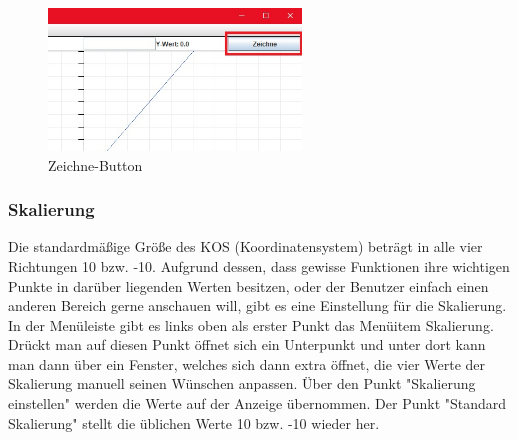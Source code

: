 \begin{figure}[ht]
	\centering
	\includegraphics[width=0.6\textwidth]{Bilder/GR_3.jpg}
	\caption{Zeichne-Button}
\end{figure}


\subsubsection{Skalierung}
Die standardmäßige Größe des KOS (Koordinatensystem) beträgt in alle vier Richtungen 10 bzw. -10.
Aufgrund dessen, dass gewisse Funktionen ihre wichtigen Punkte in darüber liegenden Werten besitzen, oder der Benutzer einfach einen anderen Bereich gerne anschauen will, gibt es eine Einstellung für die Skalierung. 
\newline
In der Menüleiste gibt es links oben als erster Punkt das Menüitem Skalierung. Drückt man auf diesen Punkt öffnet sich ein Unterpunkt und unter dort kann man dann über ein Fenster, welches sich dann extra öffnet, die vier Werte der Skalierung manuell seinen Wünschen anpassen. Über den Punkt "Skalierung einstellen" werden die Werte auf der Anzeige übernommen. Der Punkt "Standard Skalierung" stellt die üblichen Werte 10 bzw. -10 wieder her.

\begin{figure}[ht]
	\begin{center}
	\hspace{1cm}
	\end{center}
\end{figure}

